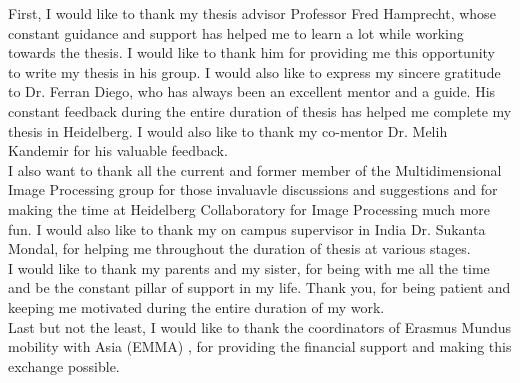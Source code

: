 
\begin{acknowledgements}      

First, I would like to thank my thesis advisor Professor Fred Hamprecht, whose constant guidance and support has helped me to learn a lot while working towards the thesis. I would like to thank him for providing me this opportunity to write my thesis in his group. I would also like to express my sincere gratitude to Dr. Ferran Diego, who has always been an excellent mentor and a guide. His constant feedback during the entire duration of thesis has helped me complete my thesis in Heidelberg. I would also like to thank my co-mentor Dr. Melih Kandemir for his valuable feedback.\\

I also want to thank all the current and former member of the Multidimensional Image Processing group for those invaluavle discussions and suggestions and  for making the time at Heidelberg Collaboratory for Image Processing much more fun.
I would also like to thank my on campus supervisor in India Dr. Sukanta Mondal, for helping me throughout the duration of thesis at various stages.\\

I would like to thank my parents and my sister, for being with me all the time and be the constant pillar of support in my life. Thank you, for being patient and keeping me motivated during the entire duration of my work.\\

Last but not the least, I would like to thank the coordinators of Erasmus Mundus mobility with Asia (EMMA) , for providing the financial support and making this exchange possible. 


\end{acknowledgements}
